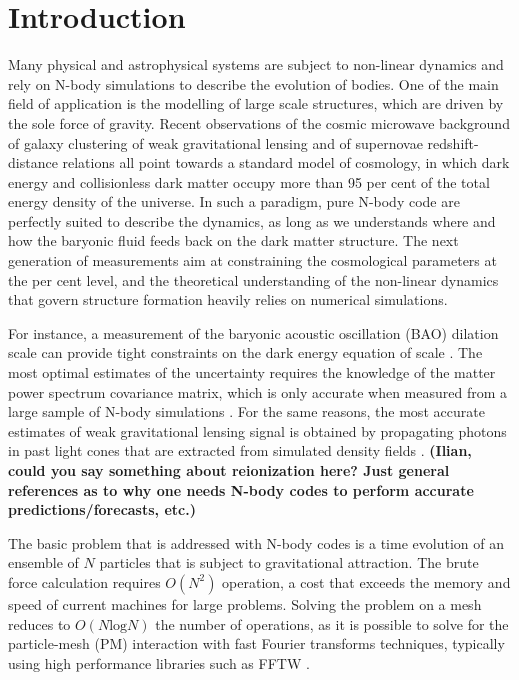 \section{Introduction}

Many physical and astrophysical systems are subject to non-linear dynamics
and rely on N-body simulations to describe the evolution of bodies. 
One of the main field of application is the modelling of large scale structures, 
which are driven by the sole force of gravity. Recent observations of the cosmic microwave background
\citep{WMAP5-7} of galaxy clustering \citep{2df, SDSS, WiggleZ, BOSS} of weak gravitational lensing \citep{CFHTLS, SDSS}
and of supernovae redshift-distance relations all point towards a standard model of cosmology, in which dark energy
and collisionless dark matter occupy more than 95 per cent of the total energy density of the universe.
In such a paradigm, pure N-body code are perfectly suited to describe the dynamics, as long as we
understands where and how the baryonic fluid feeds back on the dark matter structure.
The next generation of measurements aim at constraining the cosmological parameters at the per cent level, 
and the theoretical understanding of the non-linear dynamics that govern structure formation heavily relies 
on numerical simulations. 

For instance, a measurement of the baryonic acoustic oscillation (BAO) dilation scale can provide
tight constraints on the dark energy equation of scale \citep{Seo2003,2005}.
The most optimal estimates of the uncertainty requires the knowledge of the 
matter power spectrum covariance matrix, which is only accurate when measured from a large sample 
of N-body simulations \citep{RH2005, japan2,japan3}.
For the same reasons, the most accurate estimates of weak gravitational lensing signal is obtained
by propagating photons in past light cones that are extracted from simulated density fields \citep{White, Jain, Takahashi}.
{\bf (Ilian, could you say something about reionization here? Just general references as to why one needs N-body codes to perform 
accurate predictions/forecasts, etc.)}

The basic problem that is addressed with N-body codes is a time evolution of an ensemble of $N$ particles
that is subject to gravitational attraction. The brute force calculation requires $O(N^{2})$ operation, a cost that 
exceeds the memory and speed of current machines for large problems.
Solving the problem  on a mesh \citep{Hockney} reduces to $O(N\mbox{log}N)$ the number of operations,
as it is possible to solve for the particle-mesh (PM) interaction with fast Fourier transforms techniques, 
typically using high performance libraries such as {\small FFTW} \citep{FFTW}.


